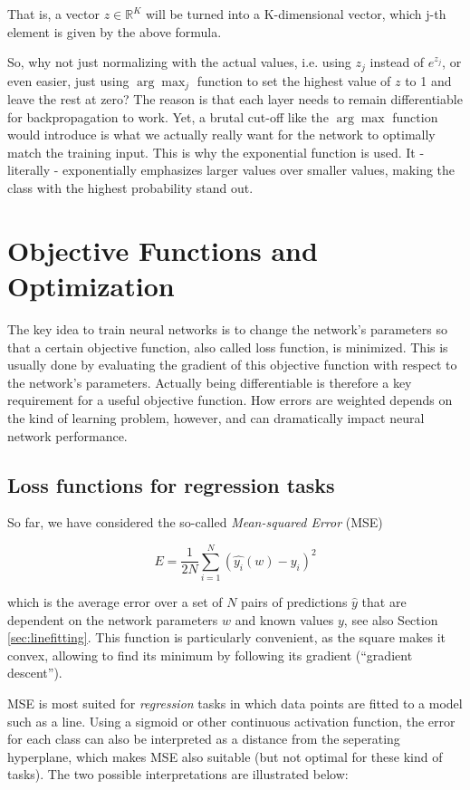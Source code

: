 That is, a vector $z \in \mathbb{R}^K$ will be turned into a K-dimensional vector, which j-th element is given by the above formula.

So, why not just normalizing with the actual values, i.e. using $z_j$ instead of $e^{z_j}$, or even easier, just using $\arg \max_j$ function to set the highest value of $z$ to 1 and leave the rest at zero? The reason is that each layer needs to remain differentiable for backpropagation to work. Yet, a brutal cut-off like the $\arg \max$ function would introduce is what we actually really want for the network to optimally match the training input. This is why the exponential function is used. It - literally - exponentially emphasizes larger values over smaller values, making the class with the highest probability stand out.

\section{Objective Functions and Optimization}
The key idea to train neural networks is to change the network's parameters so that a certain objective function, also called loss function, is minimized. This is usually done by evaluating the gradient of this objective function with respect to the network's parameters. Actually being differentiable is therefore a key requirement for a useful objective function. How errors are weighted depends on the kind of learning problem, however, and can dramatically impact neural network performance.

\subsection{Loss functions for regression tasks}
So far, we have considered the so-called \emph{Mean-squared Error} (MSE)

\begin{equation}
E=\frac{1}{2N}\sum_{i=1}^{N}(\hat{y_i}(w)-y_i)^2
\end{equation}

which is the average error over a set of $N$ pairs of predictions $\hat{y}$ that are dependent on the network parameters $w$ and known values $y$, see also Section \ref{sec:linefitting}. This function is particularly convenient, as the square makes it convex, allowing to find its minimum by following its gradient (``gradient descent'').

MSE is most suited for \emph{regression} tasks in which data points are fitted to a model such as a line. Using a sigmoid or other continuous activation function, the error for each class can also be interpreted as a distance from the seperating hyperplane, which makes MSE also suitable (but not optimal for these kind of tasks). The two possible interpretations are illustrated below:

